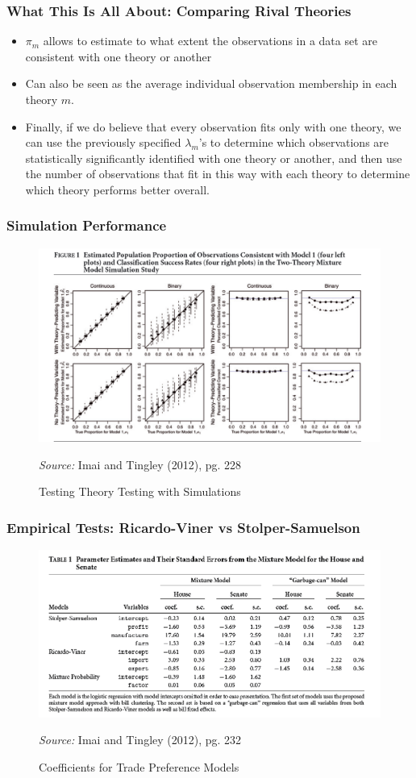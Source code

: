 \documentclass{beamer}
\begin{document}
\begin{frame}
\frametitle{What This Is All About: Comparing Rival Theories}
\begin{itemize}
	\item $\pi_m$ allows to estimate to what extent the observations in a data set are consistent with one theory or another
	\item Can also be seen as the average individual observation membership in each theory $m$.
	\item Finally, if we do believe that every observation fits only with one theory, we can use the previously specified $\lambda_m$'s to determine which observations are statistically significantly identified with one theory or another, and then use the number of observations that fit in this way with each theory to determine which theory performs better overall. 
\end{itemize}
\end{frame}  


\begin{frame}
\frametitle{Simulation Performance}
\begin{figure}
	\centering
	\includegraphics[width=0.7\linewidth]{theory_testing_sims}
	\caption{Testing Theory Testing with Simulations}
	
	\textit{Source:} Imai and Tingley (2012), pg. 228
	\label{fig:theory_testing_sims}
\end{figure}
\end{frame}                       


\begin{frame}
\frametitle{Empirical Tests: Ricardo-Viner vs Stolper-Samuelson}
\begin{figure}
	\centering
	\includegraphics[width=0.7\linewidth]{table1}
	\caption{Coefficients for Trade Preference Models}
	
	\textit{Source:} Imai and Tingley (2012), pg. 232
	\label{fig:table1}
\end{figure}
\end{frame}
\end{document}
